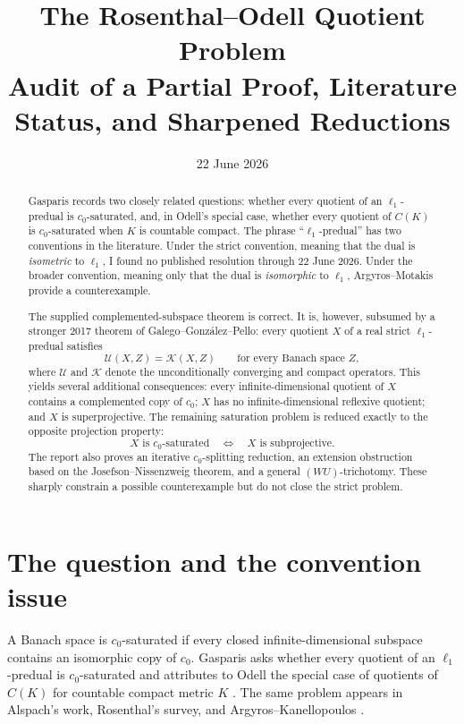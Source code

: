 \documentclass[11pt]{article}
\title{\textbf{The Rosenthal--Odell Quotient Problem}\\
\large Audit of a Partial Proof, Literature Status, and Sharpened Reductions}
\author{}
\date{22 June 2026}
\theoremstyle{definition}
\newcommand{\cU}{\mathcal U}
\newcommand{\cK}{\mathcal K}
\begin{document}
\maketitle

\begin{abstract}
Gasparis records two closely related questions: whether every quotient of an
$\ell_1$-predual is $c_0$-saturated, and, in Odell's special case, whether every
quotient of $C(K)$ is $c_0$-saturated when $K$ is countable compact.  The phrase
``$\ell_1$-predual'' has two conventions in the literature.  Under the strict
convention, meaning that the dual is \emph{isometric} to $\ell_1$, I found no
published resolution through 22 June 2026.  Under the broader convention,
meaning only that the dual is \emph{isomorphic} to $\ell_1$, Argyros--Motakis
provide a counterexample.

The supplied complemented-subspace theorem is correct.  It is, however,
subsumed by a stronger 2017 theorem of Galego--Gonz\'alez--Pello: every quotient
$X$ of a real strict $\ell_1$-predual satisfies
\[
   \cU(X,Z)=\cK(X,Z) \qquad\text{for every Banach space } Z,
\]
where $\cU$ and $\cK$ denote the unconditionally converging and compact
operators.  This yields several additional consequences: every
infinite-dimensional quotient of $X$ contains a complemented copy of $c_0$;
$X$ has no infinite-dimensional reflexive quotient; and $X$ is
superprojective.  The remaining saturation problem is reduced exactly to the
opposite projection property:
\[
  X \text{ is } c_0\text{-saturated}
  \quad\Longleftrightarrow\quad
  X \text{ is subprojective}.
\]
The report also proves an iterative $c_0$-splitting reduction, an extension
obstruction based on the Josefson--Nissenzweig theorem, and a general
$(WU)$-trichotomy.  These sharply constrain a possible counterexample but do
not close the strict problem.
\end{abstract}

\section{The question and the convention issue}

A Banach space is $c_0$-saturated if every closed infinite-dimensional
subspace contains an isomorphic copy of $c_0$.  Gasparis asks whether every
quotient of an $\ell_1$-predual is $c_0$-saturated and attributes to Odell the
special case of quotients of $C(K)$ for countable compact metric $K$
\cite[p.~492]{Gasparis2009}.  The same problem appears in Alspach's work,
Rosenthal's survey, and Argyros--Kanellopoulos
\cite{Alspach1993,Rosenthal2003,ArgyrosKanellopoulos2005}.
\end{document}
